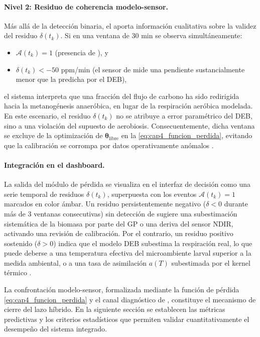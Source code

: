 \paragraph{Nivel 2: Residuo de coherencia modelo-sensor.}
Más allá de la detección binaria, el  aporta información cualitativa sobre la validez del residuo $\delta(t_k)$. Si en una ventana de \num{30} min se observa simultáneamente:
\begin{itemize}
    \item $\mathcal{A}(t_k) = 1$ (presencia de ), y
    \item $\delta(t_k) < -\num{50}$ ppm/min (el sensor de  mide una pendiente sustancialmente menor que la predicha por el DEB),
\end{itemize}
el sistema interpreta que una fracción del flujo de carbono ha sido redirigida hacia la metanogénesis anaeróbica, en lugar de la respiración aeróbica modelada. En este escenario, el residuo $\delta(t_k)$ no se atribuye a error paramétrico del DEB, sino a una violación del supuesto de aerobiosis. Consecuentemente, dicha ventana se excluye de la optimización de $\boldsymbol{\theta}_{\mathrm{libre}}$ en la \cref{eq:cap4_funcion_perdida}, evitando que la calibración se corrompa por datos operativamente anómalos \parencite{rossiEstimatingDynamicsGreenhouse2024}.

\paragraph{Integración en el dashboard.}
La salida del módulo de pérdida se visualiza en el interfaz de decisión como una serie temporal de residuos $\delta(t_k)$, superpuesta con los eventos $\mathcal{A}(t_k) = 1$ marcados en color ámbar. Un residuo persistentemente negativo ($\delta < 0$ durante más de \num{3} ventanas consecutivas) sin detección de  sugiere una subestimación sistemática de la biomasa por parte del GP o una deriva del sensor NDIR, activando una revisión de calibración. Por el contrario, un residuo positivo sostenido ($\delta > 0$) indica que el modelo DEB subestima la respiración real, lo que puede deberse a una temperatura efectiva del microambiente larval superior a la medida ambiental, o a una tasa de asimilación $a(T)$ subestimada por el kernel térmico \parencite{eriksenDynamicModellingFeed2022}.

La confrontación modelo-sensor, formalizada mediante la función de pérdida \eqref{eq:cap4_funcion_perdida} y el canal diagnóstico de , constituye el mecanismo de cierre del lazo híbrido. En la siguiente sección se establecen las métricas predictivas y los criterios estadísticos que permiten validar cuantitativamente el desempeño del sistema integrado.

